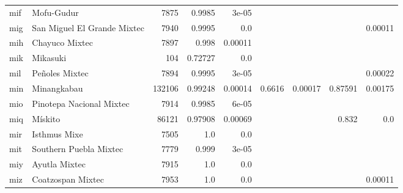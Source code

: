 \documentclass[11pt]{article}
\begin{document}
\begin{table*}[h]
{\begin{tabular}{llrrrrrrr}
mif         & Mofu-Gudur         & 7875         & 0.9985         & 3e-05         &          &          &          &          \\

mig         & San Miguel El Grande Mixtec         & 7940         & 0.9995         & 0.0         &          &          &          & 0.00011         \\

mih         & Chayuco Mixtec         & 7897         & 0.998         & 0.00011         &          &          &          &          \\

mik         & Mikasuki         & 104         & 0.72727         & 0.0         &          &          &          &          \\

mil         & Peñoles Mixtec         & 7894         & 0.9995         & 3e-05         &          &          &          & 0.00022         \\

min         & Minangkabau         & 132106         & 0.99248         & 0.00014         & 0.6616         & 0.00017         & 0.87591         & 0.00175         \\

mio         & Pinotepa Nacional Mixtec         & 7914         & 0.9985         & 6e-05         &          &          &          &          \\

miq         & Mískito         & 86121         & 0.97908         & 0.00069         &          &          & 0.832         & 0.0         \\

mir         & Isthmus Mixe         & 7505         & 1.0         & 0.0         &          &          &          &          \\

mit         & Southern Puebla Mixtec         & 7779         & 0.999         & 3e-05         &          &          &          &          \\

miy         & Ayutla Mixtec         & 7915         & 1.0         & 0.0         &          &          &          &          \\

miz         & Coatzospan Mixtec         & 7953         & 1.0         & 0.0         &          &          &          & 0.00011         \\


\end{tabular}}
\end{table*}
\end{document}
